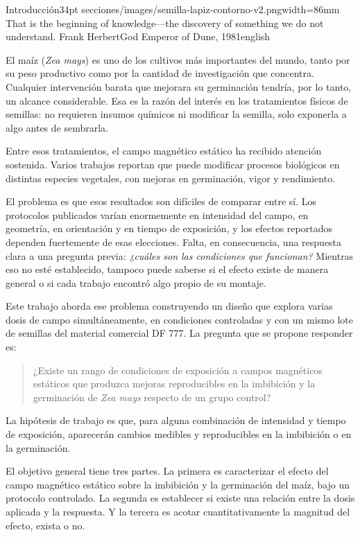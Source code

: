 \aperturacapitulo
  {Introducción}{34pt}
  {secciones/images/semilla-lapiz-contorno-v2.png}{width=86mm}
  {That is the beginning of knowledge---the discovery of something we do not understand.}
  {Frank Herbert}{God Emperor of Dune, 1981}{english}


El maíz (\textit{Zea mays}) es uno de los cultivos más importantes del mundo, tanto por su peso productivo como por la cantidad de investigación que concentra. Cualquier intervención barata que mejorara su germinación tendría, por lo tanto, un alcance considerable. Esa es la razón del interés en los tratamientos físicos de semillas: no requieren insumos químicos ni modificar la semilla, solo exponerla a algo antes de sembrarla.

Entre esos tratamientos, el campo magnético estático ha recibido atención sostenida. Varios trabajos \cite{araujo_2016,sarraf_2020,vashisth_joshi_2017,ferroni_2024} reportan que puede modificar procesos biológicos en distintas especies vegetales, con mejoras en germinación, vigor y rendimiento.

El problema es que esos resultados son difíciles de comparar entre sí. Los protocolos publicados varían enormemente en intensidad del campo, en geometría, en orientación y en tiempo de exposición, y los efectos reportados dependen fuertemente de esas elecciones. Falta, en consecuencia, una respuesta clara a una pregunta previa: \emph{¿cuáles son las condiciones que funcionan?} Mientras eso no esté establecido, tampoco puede saberse si el efecto existe de manera general o si cada trabajo encontró algo propio de su montaje.

Este trabajo aborda ese problema construyendo un diseño que explora varias dosis de campo simultáneamente, en condiciones controladas y con un mismo lote de semillas del material comercial DF 777. La pregunta que se propone responder es:

\begin{quote}
¿Existe un rango de condiciones de exposición a campos magnéticos estáticos que produzca mejoras reproducibles en la imbibición y la germinación de \textit{Zea mays} respecto de un grupo control?
\end{quote}

La hipótesis de trabajo es que, para alguna combinación de intensidad y tiempo de exposición, aparecerán cambios medibles y reproducibles en la imbibición o en la germinación.

El objetivo general tiene tres partes. La primera es caracterizar el efecto del campo magnético estático sobre la imbibición y la germinación del maíz, bajo un protocolo controlado. La segunda es establecer si existe una relación entre la dosis aplicada y la respuesta. Y la tercera es acotar cuantitativamente la magnitud del efecto, exista o no.

